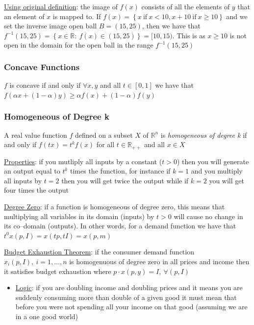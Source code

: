 \documentclass{article}
\begin{document}
  \par
  \underline{Using original definition}: the image of $f(x)$ consists of all the elements of $y$ that an element of $x$ is mapped to. If $f(x) = \left\{x \ \text{if} \ x < 10, x + 10 \ \text{if} \ x \geq 10 \right\}$ and we set the inverse image open ball $B = (15, 25)$, then  we have that $f^{-1}(15,25) = \left\{ x \in \mathbb{R}: \ f(x) \in (15, 25) \right\} = [10, 15)$. This is as $x \geq 10$ is not open in the domain for the open ball in the range $f^{-1}(15,25)$
  \par
\vspace{6mm}
\subsubsection{Concave Functions}
$f$ is concave if and only if $\forall x,y$ and all $t \in [0,1]$ we have that $f(\alpha x + (1-\alpha)y) \geq \alpha f(x) + (1-\alpha)f(y) $\par \vspace{0.3em}
\subsubsection{Homogeneous of Degree k}
A real value function $f$ defined on a subset $X$ of $\mathbb{R}^{n}$ is \textit{homogeneous of degree k} if and only if $f(tx) = t^{k}f(x)$ for all $t \in \mathbb{R}_{++}$ and all $x \in X$ \par \vspace{0.3em}
  \underline{Properties}: if you mutliply all inputs by a constant ($t > 0$) then you will generate an output equal to $t^{k}$ times the function, for instance if $k=1$ and you multiply all inputs by $t=2$ then you will get twice the output while if $k = 2$ you will get four times the output
  \par
  \underline{Degree Zero}: if a function is homogeneous of degree zero, this means that multiplying all variables in its domain (inputs) by $t > 0$ will cause no change in its co--domain (outputs). In other words, for a demand function we have that $t^{0}x(p, I) = x(tp, tI) = x(p,m)$
  \par
  \underline{Budget Exhaustion Theorem}: if the consumer demand function $x_{i}(p,I), \ i = 1, \dots, n$ is homogenuous of degree zero in all prices and income then it satisfies budget exhaustion where $p \cdot x(p,y) = I, \ \forall (p,I)$
  \begin{itemize}
    \item  \underline{Logic}: if you are doubling income and doubling prices and it means you are suddenly consuming more than double of a given good it must mean that before you were not spending all your income on that good (assuming we are in a one good world)
  \end{itemize}
\end{document}
